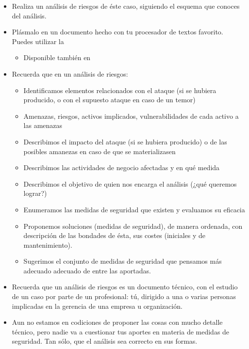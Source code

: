 \begin{itemize}
\item Realiza un análisis de riesgos de éste caso, siguiendo el esquema que conoces del análisis.
\item Plásmalo en un documento hecho con tu procesador de textos favorito. Puedes utilizar la 
  \begin{itemize}
  \item Disponible también en
\end{itemize}

\item Recuerda que en un análisis de riesgos:
  \begin{itemize}
  \item Identificamos elementos relacionados con el ataque (si se hubiera producido, o con el supuesto ataque en    caso de un temor)
  \item Amenazas, riesgos, activos implicados, vulnerabilidades de cada activo a las amenazas
  \item Describimos el impacto del ataque (si se hubiera producido) o de las posibles amanezas en caso de que se materializasen
  \item Describimos las actividades de negocio afectadas y en qué medida
  \item Describimos el objetivo de quien nos encarga el análisis (¿qué queremos lograr?)
  \item Enumeramos las medidas de seguridad que existen y evaluamos su eficacia
  \item Proponemos soluciones (medidas de seguridad), de manera ordenada, con descripción de las bondades de ésta, sus costes (iniciales y de mantenimiento).
  \item Sugerimos el conjunto de medidas de seguridad que pensamos más adecuado adecuado de entre las aportadas.
  \end{itemize}
\item Recuerda que un análisis de riesgos es un documento técnico, con el estudio de un caso por parte de un profesional: tú, dirigido a una o varias personas implicadas en la gerencia de una empresa u organización.
\item Aun no estamos en codiciones de proponer las cosas con mucho detalle técnico, pero nadie va a cuestionar tus aportes en materia de medidas de seguridad. Tan sólo, que el análisis sea correcto en sus formas.
\end{itemize}

